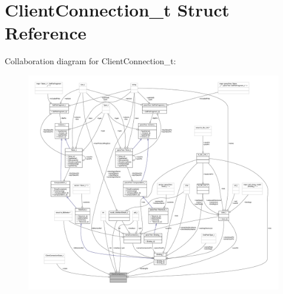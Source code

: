 \hypertarget{struct_client_connection__t}{}\section{Client\+Connection\+\_\+t Struct Reference}
\label{struct_client_connection__t}


Collaboration diagram for Client\+Connection\+\_\+t\+:
\nopagebreak
\begin{figure}[H]
\begin{center}
\leavevmode
\includegraphics[width=350pt]{struct_client_connection__t__coll__graph}
\end{center}
\end{figure}
